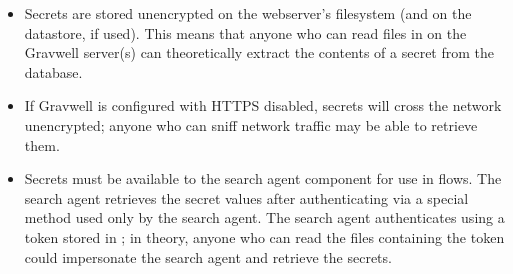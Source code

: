 \begin{itemize}
\item Secrets are stored unencrypted on the webserver's filesystem (and on the datastore, if used). This means that anyone who can read files in  on the Gravwell server(s) can theoretically extract the contents of a secret from the database.
\item If Gravwell is configured with HTTPS disabled, secrets will cross the network unencrypted; anyone who can sniff network traffic may be able to retrieve them.
\item Secrets must be available to the search agent component for use in flows. The search agent retrieves the secret values after authenticating via a special method used only by the search agent. The search agent authenticates using a token stored in ; in theory, anyone who can read the files containing the token could impersonate the search agent and retrieve the secrets.
\end{itemize}

